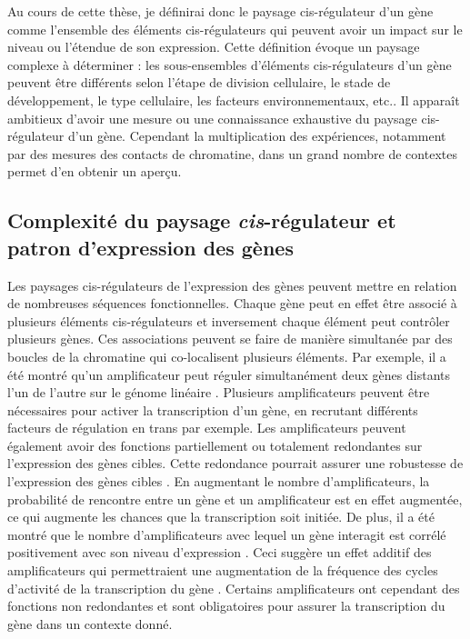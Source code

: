 Au cours de cette thèse, je définirai donc le paysage \gls{cis}-régulateur d’un gène comme l’ensemble des éléments \gls{cis}-régulateurs qui peuvent avoir un impact sur le niveau ou l’étendue de son expression. Cette définition évoque un paysage complexe à déterminer : les sous-ensembles d’éléments \gls{cis}-régulateurs d’un gène peuvent être différents selon l’étape de division cellulaire, le stade de développement, le type cellulaire, les facteurs environnementaux, etc.. Il apparaît ambitieux d’avoir une mesure ou une connaissance exhaustive du paysage \gls{cis}-régulateur d’un gène. Cependant la multiplication des expériences, notamment par des mesures des contacts de chromatine, dans un grand nombre de contextes permet d’en obtenir un aperçu.

\subsection{Complexité du paysage \textit{cis}-régulateur et patron d’expression des gènes}
\label{subsec:complexite}

Les paysages \gls{cis}-régulateurs de l’expression des gènes peuvent mettre en relation de nombreuses séquences fonctionnelles. Chaque gène peut en effet être associé à plusieurs éléments \gls{cis}-régulateurs et inversement chaque élément peut contrôler plusieurs gènes. Ces associations peuvent se faire de manière simultanée par des boucles de la chromatine qui co-localisent plusieurs éléments. Par exemple, il a été montré qu’un \gls{amplificateur} peut réguler simultanément deux gènes distants l’un de l’autre sur le génome linéaire \citep{fukaya_enhancer_2016}. Plusieurs \glspl{amplificateur} peuvent être nécessaires pour activer la transcription d’un gène, en recrutant différents facteurs de régulation en \gls{trans} par exemple. Les \glspl{amplificateur} peuvent également avoir des fonctions partiellement ou totalement redondantes sur l’expression des gènes cibles. Cette redondance pourrait assurer une robustesse de l’expression des gènes cibles \citep{berthelot_complexity_2018}. En augmentant le nombre d’\glspl{amplificateur}, la probabilité de rencontre entre un gène et un \gls{amplificateur} est en effet augmentée, ce qui augmente les chances que la transcription soit initiée. De plus, il a été montré que le nombre d’\glspl{amplificateur} avec lequel un gène interagit est corrélé positivement avec son niveau d’expression \citep{schoenfelder_pluripotent_2015, mifsud_mapping_2015, javierre_lineage-specific_2016, berthelot_complexity_2018}. Ceci suggère un effet additif des \glspl{amplificateur} qui permettraient une augmentation de la fréquence des cycles d’activité de la transcription du gène \citep{bartman_enhancer_2016}. Certains \glspl{amplificateur} ont cependant des fonctions non redondantes et sont obligatoires pour assurer la transcription du gène dans un contexte donné. \\

